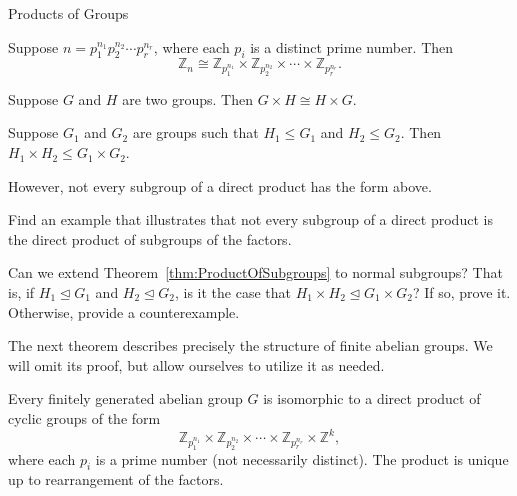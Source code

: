 \begin{section}{Products of Groups}
\begin{theorem}
Suppose $n=p_1^{n_1}p_2^{n_2}\cdots p_r^{n_r}$, where each $p_i$ is a distinct prime number.  Then
\[
\mathbb{Z}_n\cong \mathbb{Z}_{p_1^{n_1}}\times \mathbb{Z}_{p_2^{n_2}}\times \cdots \times \mathbb{Z}_{p_r^{n_r}}.
\]
\end{theorem}

\begin{theorem}
Suppose $G$ and $H$ are two groups.  Then $G\times H\cong H\times G$.
\end{theorem}

\begin{theorem}\label{thm:ProductOfSubgroups}
Suppose $G_1$ and $G_2$ are groups such that $H_1\leq G_1$ and $H_2\leq G_2$.  Then $H_1\times H_2\leq G_1\times G_2$.
\end{theorem}

However, not every subgroup of a direct product has the form above. 

\begin{problem}
Find an example that illustrates that not every subgroup of a direct product is the direct product of subgroups of the factors.
\end{problem}

\begin{problem}
Can we extend Theorem~\ref{thm:ProductOfSubgroups} to normal subgroups?  That is, if $H_1\trianglelefteq G_1$ and $H_2\trianglelefteq G_2$, is it the case that $H_1\times H_2\trianglelefteq G_1\times G_2$? If so, prove it.  Otherwise, provide a counterexample.
\end{problem}


The next theorem describes precisely the structure of finite abelian groups.  We will omit its proof, but allow ourselves to utilize it as needed.

\begin{theorem}
Every finitely generated abelian group $G$ is isomorphic to a direct product of cyclic groups of the form
\[
\mathbb{Z}_{p_1^{n_1}}\times \mathbb{Z}_{p_2^{n_2}}\times \cdots \times \mathbb{Z}_{p_r^{n_r}}\times \mathbb{Z}^k,
\]
where each $p_i$ is a prime number (not necessarily distinct).  The product is unique up to rearrangement of the factors.
\end{theorem}


\end{section}
